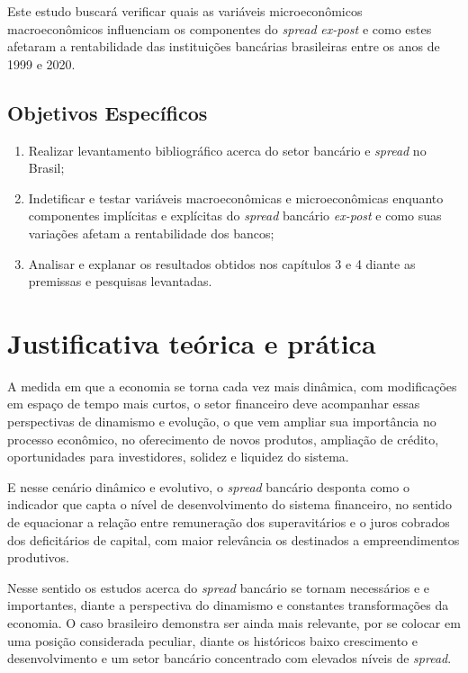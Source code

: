 \documentclass[12pt,openright,oneside,a4paper,chapter=TITLE,section=TITLE,subsection=TITLE,english,french,spanish,portugues,sumario=tradicional]{04-class-files/abntex2}
\providecommand{\tightlist}{%
  \setlength{\itemsep}{0pt}\setlength{\parskip}{0pt}}
\begin{document}
Este estudo buscará verificar quais as variáveis microeconômicos macroeconômicos influenciam os componentes do \emph{spread} \emph{ex-post} e como estes afetaram a rentabilidade das instituições bancárias brasileiras entre os anos de 1999 e 2020.

\subsection{Objetivos Específicos}

\begin{enumerate}
\def\labelenumi{\arabic{enumi}.}
\tightlist
\item
  Realizar levantamento bibliográfico acerca do setor bancário e \emph{spread} no Brasil;
\item
  Indetificar e testar variáveis macroeconômicas e microeconômicas enquanto componentes implícitas e explícitas do \emph{spread} bancário \emph{ex-post} e como suas variações afetam a rentabilidade dos bancos;
\item
  Analisar e explanar os resultados obtidos nos capítulos 3 e 4 diante as premissas e pesquisas levantadas.
\end{enumerate}

\section{Justificativa teórica e prática}

A medida em que a economia se torna cada vez mais dinâmica, com modificações em
espaço de tempo mais curtos, o setor financeiro deve acompanhar essas
perspectivas de dinamismo e evolução, o que vem ampliar sua importância no
processo econômico, no oferecimento de novos produtos, ampliação de crédito, oportunidades para investidores, solidez e liquidez do sistema.

E nesse cenário dinâmico e evolutivo, o \emph{spread} bancário desponta como o
indicador que capta o nível de desenvolvimento do sistema financeiro, no
sentido de equacionar a relação entre remuneração dos superavitários e o juros
cobrados dos deficitários de capital, com maior relevância os destinados a empreendimentos produtivos.

Nesse sentido os estudos acerca do \emph{spread} bancário se tornam necessários e
e importantes, diante a perspectiva do dinamismo e constantes transformações da economia. O caso brasileiro demonstra ser ainda mais relevante, por se colocar em uma posição considerada peculiar, diante os históricos baixo crescimento e desenvolvimento e um setor bancário concentrado com elevados níveis de \emph{spread}.
\end{document}
